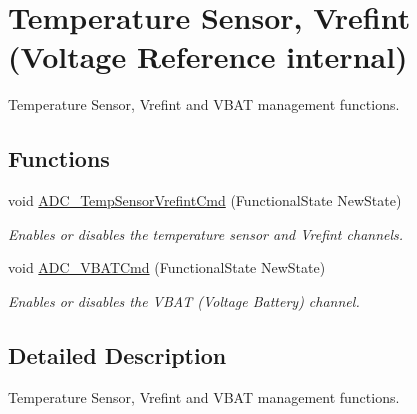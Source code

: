\hypertarget{group___a_d_c___group3}{}\section{Temperature Sensor, Vrefint (Voltage Reference internal)}
\label{group___a_d_c___group3}


Temperature Sensor, Vrefint and V\+B\+A\+T management functions.  


\subsection*{Functions}
\begin{DoxyCompactItemize}
\item 
void \hyperlink{group___a_d_c___group3_ga848682e2d7d3de9f8cf03ffa4c11f0b5}{A\+D\+C\+\_\+\+Temp\+Sensor\+Vrefint\+Cmd} (Functional\+State New\+State)
\begin{DoxyCompactList}\small\item\em Enables or disables the temperature sensor and Vrefint channels. \end{DoxyCompactList}\item 
void \hyperlink{group___a_d_c___group3_ga17fc58510ddc80024e65d9738ad6e98c}{A\+D\+C\+\_\+\+V\+B\+A\+T\+Cmd} (Functional\+State New\+State)
\begin{DoxyCompactList}\small\item\em Enables or disables the V\+B\+A\+T (Voltage Battery) channel. \end{DoxyCompactList}\end{DoxyCompactItemize}


\subsection{Detailed Description}
Temperature Sensor, Vrefint and V\+B\+A\+T management functions. 

